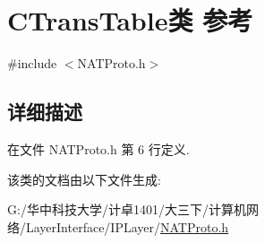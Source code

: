 \hypertarget{class_c_trans_table}{}\section{C\+Trans\+Table类 参考}
\label{class_c_trans_table}


{\ttfamily \#include $<$N\+A\+T\+Proto.\+h$>$}



\subsection{详细描述}


在文件 N\+A\+T\+Proto.\+h 第 6 行定义.



该类的文档由以下文件生成\+:\begin{DoxyCompactItemize}
\item 
G\+:/华中科技大学/计卓1401/大三下/计算机网络/\+Layer\+Interface/\+I\+P\+Layer/\hyperlink{_n_a_t_proto_8h}{N\+A\+T\+Proto.\+h}\end{DoxyCompactItemize}
